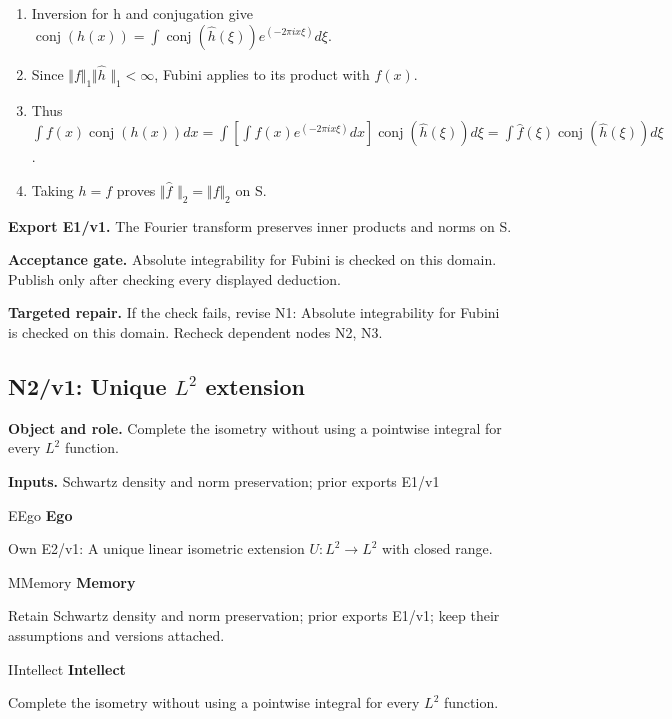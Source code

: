 \documentclass[preprint,12pt,aps,pra,showkeys,amsmath,amssymb,superscriptaddress,floatfix]{revtex4-2}
\theoremstyle{definition}
\theoremstyle{remark}
\newcommand{\mmfaculty}[3]{%
 \begin{mmfacultybox}{#1}{#2}
 {\sffamily\bfseries\color{MMBlue}#2}\par\smallskip #3
 \end{mmfacultybox}}
\newcommand{\field}[2]{\par\smallskip\noindent\textbf{#1.} #2\par}
\begin{document}
\begin{enumerate}[label=N1.\arabic*,leftmargin=3.4em]

\item Inversion for h and conjugation give
\(\operatorname{conj} (h(x))=\int \operatorname{conj} (\widehat h(\xi ))e^{(-2\pi ix\xi )}d\xi\).

\item Since \(\Vert f\Vert _{1}\Vert \widehat h\) \(\Vert _{1}<\infty\),
Fubini applies to its product with \(f(x)\).

\item Thus
\(\int f(x)\operatorname{conj} (h(x))dx=\int [\int f(x)e^{(-2\pi ix\xi )}dx]\operatorname{conj} (\widehat h(\xi ))d\xi =\int \widehat f(\xi )\operatorname{conj} (\widehat h(\xi ))d\xi\).

\item Taking \(h=f\) proves \(\Vert \widehat f\)
\(\Vert _{2}=\Vert f\Vert _{2}\) on S.

\end{enumerate}

\field{Export E1/v1}{The Fourier transform preserves inner products and norms on S.}

\field{Acceptance gate}{Absolute integrability for Fubini is checked on this domain. Publish
only after checking every displayed deduction.}

\field{Targeted repair}{If the check fails, revise N1: Absolute integrability for Fubini is
checked on this domain. Recheck dependent nodes N2, N3.}

\clearpage

\subsection{N2/v1: Unique \(L^{2}\) extension}

\field{Object and role}{Complete the isometry without using a pointwise integral for every
\(L^{2}\) function.}

\field{Inputs}{Schwartz density and norm preservation; prior exports E1/v1}

\mmfaculty{E}{Ego}{Own E2/v1: A unique linear isometric extension \(U:L^{2}\to L^{2}\) with
closed range.}

\mmfaculty{M}{Memory}{Retain Schwartz density and norm preservation; prior exports E1/v1; keep
their assumptions and versions attached.}

\mmfaculty{I}{Intellect}{Complete the isometry without using a pointwise integral for every
\(L^{2}\) function.}
\end{document}
